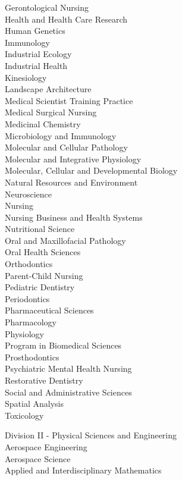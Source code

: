 \begin{enumsubsection}
\begin{enumsubsubsection}
\begin{description}
Gerontological Nursing \\
Health and Health Care Research\\
Human Genetics\\
Immunology\\
Industrial Ecology\\
Industrial Health\\
Kinesiology\\
Landscape Architecture\\
Medical Scientist Training Practice\\
Medical Surgical Nursing\\
Medicinal Chemistry\\
Microbiology and Immunology\\
Molecular and Cellular Pathology\\
Molecular and Integrative Physiology\\
Molecular, Cellular and Developmental Biology\\
Natural Resources and Environment\\
Neuroscience\\
Nursing\\
Nursing Business and Health Systems\\
Nutritional Science\\
Oral and Maxillofacial Pathology\\
Oral Health Sciences\\
Orthodontics\\
Parent-Child Nursing\\
Pediatric Dentistry\\
Periodontics\\
Pharmaceutical Sciences\\
Pharmacology\\
Physiology\\
Program in Biomedical Sciences\\
Prosthodontics\\
Psychiatric Mental Health Nursing\\
Restorative Dentistry\\
Social and Administrative Sciences\\
Spatial Analysis\\
Toxicology
\item{Division II - Physical Sciences and Engineering}\\
Aerospace Engineering\\
Aerospace Science\\
Applied and Interdisciplinary Mathematics\\

\end{description}
\end{enumsubsubsection}
\end{enumsubsection}
